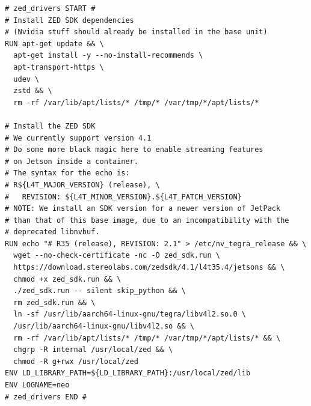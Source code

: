 \begin{center}
\begin{minipage}[t]{.9\textwidth}
\begin{lstlisting}[caption={Unit configuration of the \texttt{jetson5} target of the \texttt{zed\_drivers} DUA unit \cite{masocco_zed_drivers_nodate} as of November 26, 2024.}, label={lst:zeddriversjetson5}]
# zed_drivers START #
# Install ZED SDK dependencies
# (Nvidia stuff should already be installed in the base unit)
RUN apt-get update && \
  apt-get install -y --no-install-recommends \
  apt-transport-https \
  udev \
  zstd && \
  rm -rf /var/lib/apt/lists/* /tmp/* /var/tmp/*/apt/lists/*

# Install the ZED SDK
# We currently support version 4.1
# Do some more black magic here to enable streaming features
# on Jetson inside a container.
# The syntax for the echo is:
# R${L4T_MAJOR_VERSION} (release), \
#   REVISION: ${L4T_MINOR_VERSION}.${L4T_PATCH_VERSION}
# NOTE: We install an SDK version for a newer version of JetPack
# than that of this base image, due to an incompatibility with the
# deprecated libnvbuf.
RUN echo "# R35 (release), REVISION: 2.1" > /etc/nv_tegra_release && \
  wget --no-check-certificate -nc -O zed_sdk.run \
  https://download.stereolabs.com/zedsdk/4.1/l4t35.4/jetsons && \
  chmod +x zed_sdk.run && \
  ./zed_sdk.run -- silent skip_python && \
  rm zed_sdk.run && \
  ln -sf /usr/lib/aarch64-linux-gnu/tegra/libv4l2.so.0 \
  /usr/lib/aarch64-linux-gnu/libv4l2.so && \
  rm -rf /var/lib/apt/lists/* /tmp/* /var/tmp/*/apt/lists/* && \
  chgrp -R internal /usr/local/zed && \
  chmod -R g+rwx /usr/local/zed
ENV LD_LIBRARY_PATH=${LD_LIBRARY_PATH}:/usr/local/zed/lib
ENV LOGNAME=neo
# zed_drivers END #
\end{lstlisting}
\end{minipage}
\end{center}

